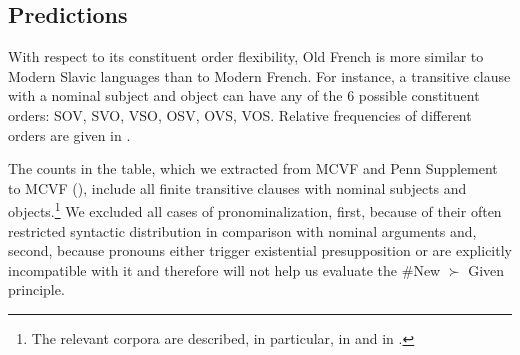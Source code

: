 \documentclass[output=paper,modfonts,nonflat]{langsci/langscibook}
\begin{document}
\subsection{Predictions}

With respect to its constituent order flexibility, Old French is more similar to Modern Slavic languages than to Modern French. For instance, a transitive clause with a nominal subject and object can have any of the 6 possible constituent orders: SOV, SVO, VSO, OSV, OVS, VOS. Relative frequencies of different orders are given in .




The counts in the table, which we extracted from MCVF \cite{MCVF} and Penn Supplement to MCVF (\citealt{KrochSantorini:2010}), include all finite transitive clauses with nominal subjects and objects.\footnote{The relevant corpora are described, in particular, in \citet{Martineau:2008} and in \citet{SimonenkoCrabbePrevost:2018}.} We excluded all cases of pronominalization, first, because of their often restricted syntactic distribution in comparison with nominal arguments and, second, because pronouns either trigger existential presupposition or are explicitly incompatible with it and therefore will not help us evaluate the \#New $\succ$ Given principle.
\end{document}

